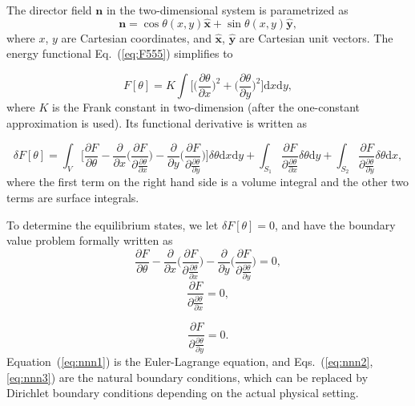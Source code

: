 \documentclass[nottitlepage]{article}
\begin{document}
 The director field $\mathbf{n}$ in the two-dimensional system is parametrized as
 \begin{equation}\label{eq:n}
 \mathbf{n}=\cos\theta(x,y)\mathbf{\hat{x}}+\sin\theta(x,y)\mathbf{\hat{y}},
 \end{equation}
 where $x$, $y$ are Cartesian coordinates, and $\mathbf{\hat{x}}$, $\mathbf{\hat{y}}$ are Cartesian unit vectors. The energy functional Eq.~(\ref{eq:F555})  simplifies to
 
 \begin{equation}\label{eq:nn}
 F[\theta]=K\int\Big[\Big(\frac{\partial \theta}{\partial x}\Big)^2+\Big(\frac{\partial \theta}{\partial y}\Big)^2\Big]\mathrm{d}x\mathrm{d}y,
  \end{equation}
 where $K$ is the Frank constant in two-dimension (after the one-constant approximation is used). Its functional derivative is written as
 
   
 \begin{equation}\label{eq:nnn}
\delta F[\theta]=\int_V\Big[\frac{\partial F}{\partial \theta} -\frac{\partial }{\partial x} \Big(\frac{\partial F}{\partial{\frac{\partial \theta}{\partial x}}}\Big) -\frac{\partial }{\partial y} \Big(\frac{\partial F}{\partial{\frac{\partial \theta}{\partial y}}}\Big)\Big]\delta\theta \mathrm{d}x\mathrm{d}y+\int_{S_1}\frac{\partial F}{\partial{\frac{\partial \theta}{\partial x}}}\delta \theta \mathrm{d}y+\int_{S_2}\frac{\partial F}{\partial{\frac{\partial \theta}{\partial y}}}\delta \theta \mathrm{d}x,
\end{equation}
 where the first term on the right hand side is a volume integral and the other two terms are surface integrals.
 
 To determine the equilibrium states, we let $\delta F[\theta]=0$, and have the boundary value problem formally written as
 \begin{equation}\label{eq:nnn1}
   \frac{\partial F}{\partial \theta} -\frac{\partial }{\partial x} \Big(\frac{\partial F}{\partial{\frac{\partial \theta}{\partial x}}}\Big) -\frac{\partial }{\partial y} \Big(\frac{\partial F}{\partial{\frac{\partial \theta}{\partial y}}}\Big)=0,
    \end{equation}
    \begin{equation}\label{eq:nnn2}
      \frac{\partial F}{\partial{\frac{\partial \theta}{\partial x}}}=0,
       \end{equation}
       
       \begin{equation}\label{eq:nnn3}
         \frac{\partial F}{\partial{\frac{\partial \theta}{\partial y}}}=0.
          \end{equation}
 Equation~(\ref{eq:nnn1}) is the Euler-Lagrange equation, and Eqs.~(\ref{eq:nnn2}, \ref{eq:nnn3}) are the natural boundary conditions, which can be replaced by Dirichlet boundary conditions depending on the actual physical setting. 
 
\end{document}
